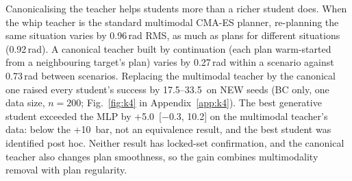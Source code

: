 Canonicalising the teacher helps students more than a richer student does. When the whip teacher is the standard multimodal CMA-ES planner, re-planning the same situation varies by 0.96\,rad RMS, as much as plans for different situations (0.92\,rad). A canonical teacher built by continuation (each plan warm-started from a neighbouring target's plan) varies by 0.27\,rad within a scenario against 0.73\,rad between scenarios. Replacing the multimodal teacher by the canonical one raised every student's success by 17.5--33.5\pp\ on NEW seeds (BC only, one data size, $n{=}200$; Fig.~\ref{fig:k4} in Appendix~\ref{app:k4}). The best generative student exceeded the MLP by +5.0\pp\ [$-0.3$, 10.2] on the multimodal teacher's data: below the +10\pp\ bar, not an equivalence result, and the best student was identified post hoc. Neither result has locked-set confirmation, and the canonical teacher also changes plan smoothness, so the gain combines multimodality removal with plan regularity.

